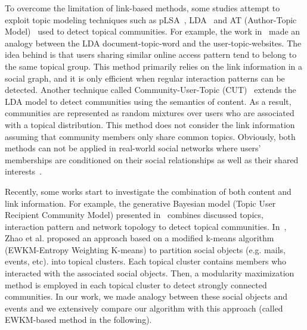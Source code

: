 To overcome the limitation of link-based methods, some studies attempt to exploit topic modeling techniques such as pLSA~\cite{Thomas:99}, LDA~\cite{Blei:MLR03} and AT (Author-Topic Model)~\cite{Steyvers:kdd04} used to detect topical communities. For example, the work in~\cite{Li:2013} made an analogy between the LDA document-topic-word and the user-topic-websites. The idea behind is that users sharing similar online access pattern tend to belong to the same topical group. This method primarily relies on the link information in a social graph, and it is only efficient when regular interaction patterns can be detected. Another technique called Community-User-Topic (CUT)~\cite{Zhou:WWW06} extends the LDA model to detect communities using the semantics of content. As a result, communities are represented as random mixtures over users who are associated with a topical distribution. This method does not consider the link information assuming that community members only share  common topics. Obviously, both methods can not be applied in real-world social networks where users' memberships are conditioned on their social relationships as well as their shared interests~\cite{Zhongying:12}.

Recently, some works start to investigate the combination of both content and link information. For example, the generative Bayesian model (Topic User Recipient Community Model) presented in~\cite{Sachan:WWW12} combines discussed topics, interaction pattern and network topology to detect topical communities. In~\cite{Zhongying:12}, Zhao et al. proposed an approach based on a modified k-means algorithm (EWKM-Entropy Weighting K-means) to partition social objects (e.g. mails, events, etc). into topical clusters. Each topical cluster contains members who interacted with the associated social objects. Then, a modularity maximization method is employed in each topical cluster to detect strongly connected communities. In our work, we made analogy between these social objects and events and we extensively compare our algorithm with this approach (called EWKM-based method in the following). 


